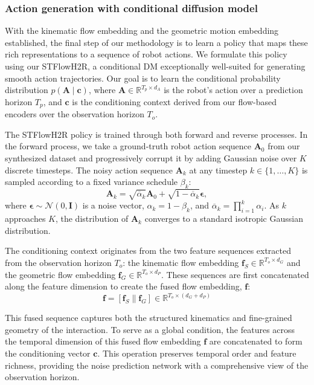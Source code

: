 \documentclass[final,5p,times,twocolumn]{elsarticle}
\begin{document}
\subsubsection{Action generation with conditional diffusion model}  \label{sec:3.3.3}
With the kinematic flow embedding and the geometric motion embedding established, the final step of our methodology is to learn a policy that maps these rich representations to a sequence of robot actions. We formulate this policy using our STFlowH2R, a conditional DM exceptionally well-suited for generating smooth action trajectories. Our goal is to learn the conditional probability distribution $p \left( \mathbf{A} \mid \mathbf{c} \right)$, where $\mathbf{A} \in \mathbb{R}^{T_p \times d_A}$ is the robot's action over a prediction horizon $T_p$, and $\mathbf{c}$ is the conditioning context derived from our flow-based encoders over the observation horizon $T_o$.

The STFlowH2R policy is trained through both forward and reverse processes. In the forward process, we take a ground-truth robot action sequence $\mathbf{A}_0$ from our synthesized dataset and progressively corrupt it by adding Gaussian noise over $K$ discrete timesteps. The noisy action sequence $\mathbf{A}_k$ at any timestep $k \in \{1, \dots, K\}$ is sampled according to a fixed variance schedule $\beta_k$:
\begin{equation}
    \mathbf{A}_k = \sqrt{\overline{\alpha}_k} \mathbf{A}_0 + \sqrt{1 - \overline{\alpha}_k} \boldsymbol{\epsilon},
\end{equation}
where $\boldsymbol{\epsilon} \sim \mathcal{N}(0, \mathbf{I})$ is a noise vector, $\alpha_k = 1 - \beta_k$, and $\overline{\alpha}_k = \prod_{i=1}^k \alpha_i$. 
As $k$ approaches $K$, the distribution of $\mathbf{A}_k$ converges to a standard isotropic Gaussian distribution.


The conditioning context originates from the two feature sequences extracted from the observation horizon $T_o$: the kinematic flow embedding  $ \bm{f}_S \in \mathbb{R}^{T_o \times d_G} $ and the geometric flow embedding $ \bm{f}_G \in \mathbb{R}^{T_o \times d_P}$. These sequences are first concatenated along the feature dimension to create the fused flow embedding, $\bm{f}$: 
\begin{equation}
    \bm{f} = [ \bm{f}_S \parallel \bm{f}_G] \in \mathbb{R}^{T_o \times (d_G + d_P)}
\end{equation}

This fused sequence captures both the structured kinematics and fine-grained geometry of the interaction. To serve as a global condition, the features across the temporal dimension of this fused flow embedding $\bm{f}$ are concatenated to form the conditioning vector $ \mathbf{c}$. This operation preserves temporal order and feature richness, providing the noise prediction network with a comprehensive view of the observation horizon.
\end{document}
